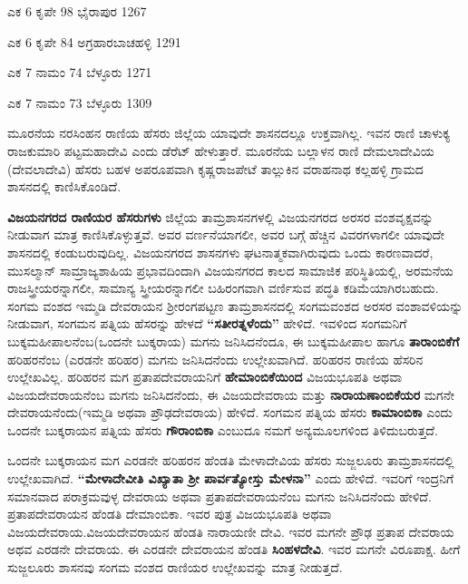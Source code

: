 {ಎಕ 6 ಕೃಪೇ 98 ಭೈರಾಪುರ 1267

ಎಕ 6 ಕೃಪೇ 84 ಅಗ್ರಹಾರಬಾಚಹಳ್ಳಿ 1291

ಎಕ 7 ನಾಮಂ 74 ಬೆಳ್ಳೂರು 1271

ಎಕ 7 ನಾಮಂ 73 ಬೆಳ್ಳೂರು 1309} ಮೂರನೆಯ ನರಸಿಂಹನ ರಾಣಿಯ ಹೆಸರು ಜಿಲ್ಲೆಯ ಯಾವುದೇ ಶಾಸನದಲ್ಲೂ ಉಕ್ತವಾಗಿಲ್ಲ. ಇವನ ರಾಣಿ ಚಾಳುಕ್ಯ ರಾಜಕುಮಾರಿ ಪಟ್ಟಮಹಾದೇವಿ ಎಂದು ಡೆರೆಟ್​ ಹೇಳುತ್ತಾರೆ. ಮೂರನೆಯ ಬಲ್ಲಾಳನ ರಾಣಿ ದೇಮಲಾದೇವಿಯ (ದೇವಲಾದೇವಿ) ಹೆಸರು ಬಹಳ ಅಪರೂಪವಾಗಿ ಕೃಷ್ಣರಾಜಪೇಟೆ ತಾಲ್ಲುಕಿನ ವರಾಹನಾಥ ಕಲ್ಲಹಳ್ಳಿ ಗ್ರಾಮದ ಶಾಸನದಲ್ಲಿ ಕಾಣಿಸಿಕೊಂಡಿದೆ.

\textbf{ವಿಜಯನಗರದ ರಾಣಿಯರ ಹೆಸರುಗಳು} ಜಿಲ್ಲೆಯ ತಾಮ್ರಶಾಸನಗಳಲ್ಲಿ ವಿಜಯನಗರದ ಅರಸರ ವಂಶವೃಕ್ಷವನ್ನು ನೀಡುವಾಗ ಮಾತ್ರ ಕಾಣಿಸಿಕೊಳ್ಳುತ್ತವೆ. ಅವರ ವರ್ಣನೆಯಾಗಲೀ, ಅವರ ಬಗ್ಗೆ ಹೆಚ್ಚಿನ ವಿವರಗಳಾಗಲೀ ಯಾವುದೇ ಶಾಸನದಲ್ಲಿ ಕಂಡುಬರುವುದಿಲ್ಲ. ವಿಜಯನಗರದ ಶಾಸನಗಳು ಘಟನಾತ್ಮಕವಾಗಿರುವುದು ಒಂದು ಕಾರಣವಾದರೆ, ಮುಸಲ್ಮಾನ್​ ಸಾಮ್ರಾಜ್ಯಶಾಹಿಯ ಪ್ರಭಾವದಿಂದಾಗಿ ವಿಜಯನಗರದ ಕಾಲದ ಸಾಮಾಜಿಕ ಪರಿಸ್ಥಿತಿಯಲ್ಲಿ, ಅರಮನೆಯ ರಾಜಸ್ತ್ರೀಯರನ್ನಾಗಲೀ, ಸಾಮಾನ್ಯ ಸ್ತ್ರೀಯರನ್ನಾಗಲೀ ಬಹಿರಂಗವಾಗಿ ವರ್ಣಿಸುವ ಪದ್ಧತಿ ಕಡಿಮೆಯಾಗಿರಬಹುದು. ಸಂಗಮ ವಂಶದ ಇಮ್ಮಡಿ ದೇವರಾಯನ ಶ‍್ರೀರಂಗಪಟ್ಟಣ ತಾಮ್ರಶಾಸನದಲ್ಲಿ ಸಂಗಮವಂಶದ ಅರಸರ ವಂಶಾವಳಿಯನ್ನು ನೀಡುವಾಗ, ಸಂಗಮನ ಪತ್ನಿಯ ಹೆಸರನ್ನು ಹೇಳದೆ \textbf{“ಸತೀರತ್ನಳೆಂದು”} ಹೇಳಿದೆ. ಇವಳಿಂದ ಸಂಗಮನಿಗೆ ಬುಕ್ಕಮಹೀಪಾಲನೆಂಬ(ಒಂದನೇ ಬುಕ್ಕರಾಯ) ಮಗನು ಜನಿಸಿದನೆಂದೂ, ಈ ಬುಕ್ಕಮಹೀಪಾಲ ಹಾಗೂ \textbf{ತಾರಾಂಬಿಕೆಗೆ} ಹರಿಹರನೆಂಬ (ಎರಡನೇ ಹರಿಹರ) ಮಗನು ಜನಿಸಿದನೆಂದು ಉಲ್ಲೇಖವಾಗಿದೆ. ಹರಿಹರನ ರಾಣಿಯ ಹೆಸರಿನ ಉಲ್ಲೇಖವಿಲ್ಲ. ಹರಿಹರನ ಮಗ ಪ್ರತಾಪದೇವರಾಯನಿಗೆ \textbf{ಹೇಮಾಂಬಿಕೆಯಿಂದ} ವಿಜಯಭೂಪತಿ ಅಥವಾ ವಿಜಯದೇವರಾಯನೆಂಬ ಮಗನು ಜನಿಸಿದನೆಂದು, ಈ ವಿಜಯದೇವರಾಯ ಮತ್ತು \textbf{ನಾರಾಯಣಾಂಬಿಕೆಯರ} ಮಗನೇ ದೇವರಾಯನೆಂದು(ಇಮ್ಮಡಿ ಅಥವಾ ಪ್ರೌಢದೇವರಾಯ) ಹೇಳಿದೆ. ಸಂಗಮನ ಪತ್ನಿಯ ಹೆಸರು \textbf{ಕಾಮಾಂಬಿಕಾ} ಎಂದು ಒಂದನೇ ಬುಕ್ಕರಾಯನ ಪತ್ನಿಯ ಹೆಸರು \textbf{ಗೌರಾಂಬಿಕಾ} ಎಂಬುದೂ ನಮಗೆ ಅನ್ಯಮೂಲಗಳಿಂದ ತಿಳಿದುಬರುತ್ತದೆ.

ಒಂದನೇ ಬುಕ್ಕರಾಯನ ಮಗ ಎರಡನೇ ಹರಿಹರನ ಹೆಂಡತಿ ಮೇಳಾದೇವಿಯ ಹೆಸರು ಸುಜ್ಜಲೂರು ತಾಮ್ರಶಾಸನ\-ದಲ್ಲಿ ಉಲ್ಲೇಖವಾಗಿದೆ. \textbf{“ಮೇಳಾದೇವೀತಿ ವಿಖ್ಯಾತಾ ಶ‍್ರೀ ಪಾರ್ವತ್ಯೋಸ್ತು ಮೇಳನಾ”} ಎಂದು ಹೇಳಿದೆ. ಇವರಿಗೆ ಇಂದ್ರನಿಗೆ ಸಮಾನವಾದ ಪರಾಕ್ರಮವುಳ್ಳ ದೇವರಾಯ ಅಥವಾ ಪ್ರತಾಪದೇವರಾಯನೆಂಬ ಮಗನು ಜನಿಸಿದನೆಂದು ಹೇಳಿದೆ. ಪ್ರತಾಪದೇವರಾಯನ ಹೆಂಡತಿ ದೇಮಾಂಬಿಕಾ. ಇವರ ಪುತ್ರ ವಿಜಯಭೂಪತಿ ಅಥವಾ ವಿಜಯದೇವರಾಯ.\break ವಿಜಯದೇವರಾಯನ ಹೆಂಡತಿ ನಾರಾಯಣೀ ದೇವಿ. ಇವರ ಮಗನೇ ಪ್ರೌಢ ಪ್ರತಾಪ ದೇವರಾಯ ಅಥವ ಎರಡನೇ ದೇವರಾಯ. ಈ ಎರಡನೇ ದೇವರಾಯನ ಹೆಂಡತಿ \textbf{ಸಿಂಹಳದೇವಿ}. ಇವರ ಮಗನೇ ವಿರೂಪಾಕ್ಷ. ಹೀಗೆ ಸುಜ್ಜಲೂರು ಶಾಸನವು ಸಂಗಮ ವಂಶದ ರಾಣಿಯರ ಉಲ್ಲೇಖವನ್ನು ಮಾತ್ರ ನೀಡುತ್ತದೆ.

